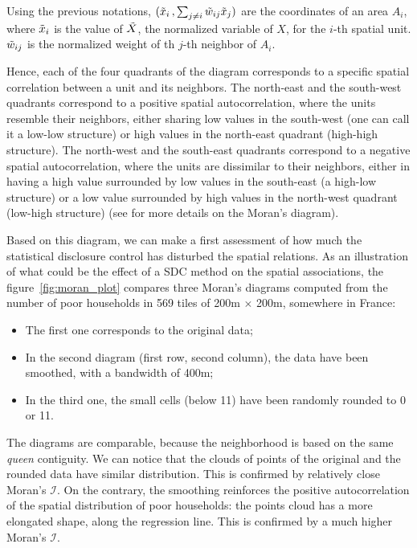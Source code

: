 Using the previous notations, $(\Tilde{x}_i\,, \sum_{j \neq i}{\Tilde{w}_{ij}\Tilde{x}_j})$ are the coordinates of an area $A_i$, where $\Tilde{x}_i$ is the value of $\Tilde{X}$, the normalized variable of $X$, for the $i$-th spatial unit. $\Tilde{w}_{ij}$ is the normalized weight of th $j$-th neighbor of $A_i$.

Hence, each of the four quadrants of the diagram corresponds to a specific spatial correlation between a unit and its neighbors. The north-east and the south-west quadrants correspond to a positive spatial autocorrelation, where the units resemble their neighbors, either sharing low values in the south-west (one can call it a low-low structure) or high values in the north-east quadrant (high-high structure). The north-west and the south-east quadrants correspond to a negative spatial autocorrelation, where the units are dissimilar to their neighbors, either in having a high value surrounded by low values in the south-east (a high-low structure) or a low value surrounded by high values in the north-west quadrant (low-high structure) (see \cite{SalimaEtAlt_2018} for more details on the Moran's diagram).

Based on this diagram, we can make a first assessment of how much the statistical disclosure control has disturbed the spatial relations. As an illustration of what could be the effect of a SDC method on the spatial associations, the figure~\ref{fig:moran_plot} compares three Moran's diagrams computed from the number of poor households in 569 tiles of 200m $\times$ 200m, somewhere in France:

\begin{itemize}
    \item The first one corresponds to the original data;
    \item In the second diagram (first row, second column), the data have been smoothed, with a bandwidth of 400m;
    \item In the third one, the small cells (below 11) have been randomly rounded to 0 or 11.
\end{itemize}

The diagrams are comparable, because the neighborhood is based on the same \textit{queen} contiguity. We can notice that the clouds of points of the original and the rounded data have similar distribution. This is confirmed by relatively close Moran's $\mathcal{I}$. On the contrary, the smoothing reinforces the positive autocorrelation of the spatial distribution of poor households: the points cloud has a more elongated shape, along the regression line. This is confirmed by a much higher Moran's $\mathcal{I}$.

